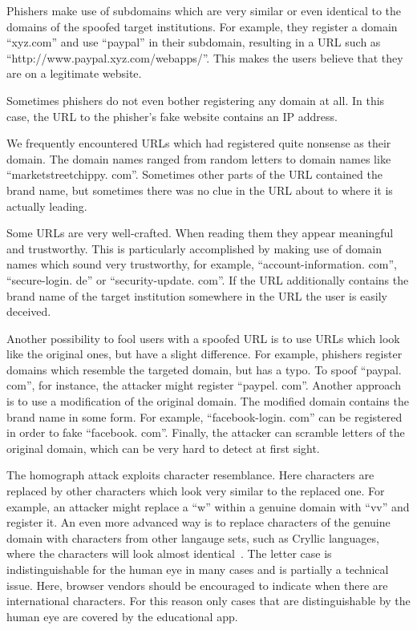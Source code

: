 \begin{description}[leftmargin=0cm]
	\item[Subdomain] Phishers make use of subdomains which are very similar or even identical to the domains of the spoofed target institutions.
 For example, they register a domain  ``xyz.com'' and use ``paypal'' in their subdomain, resulting in a URL such as ``http://www.paypal.xyz.com/webapps/''.
 This makes the users believe that they are on a legitimate website.

	\item[IP Address] Sometimes phishers do not even bother registering any domain at all.
 In this case, the URL to the phisher's fake website contains an IP address.

	\item[Nonsense Domain] We frequently encountered URLs which had registered quite nonsense as their domain.
 The domain names ranged from random letters to domain names like ``marketstreetchippy.
com''. Sometimes other parts of the URL contained the brand name, but sometimes there was no clue in the URL about to where it is actually leading.

	\item[Trustworthy, But Unrelated Domain] Some URLs are very well-crafted.
 When reading them they appear meaningful and trustworthy.
 This is particularly accomplished by making use of domain names which sound very trustworthy, for example, ``account-information.
com'', ``secure-login.
de'' or ``security-update.
com''. If the URL additionally contains the brand name of the target institution somewhere in the URL the user is easily deceived.

	\item[Similar and Deceptive Domains] Another possibility to fool users with a spoofed URL is to use URLs which look like the original ones, but have a slight difference.
 For example, phishers register domains which resemble the targeted domain, but has a typo.
 To spoof ``paypal.
com'', for instance, the attacker might register ``paypel.
com''. Another approach is to use a modification of the original domain.
 The modified domain contains the brand name in some form.
 For example, ``facebook-login.
com'' can be registered in order to fake ``facebook.
com''. Finally, the attacker can scramble letters of the original domain, which can be very hard to detect at first sight.

	\item[Homograph Attack] The homograph attack exploits character resemblance.
 Here characters are replaced by other characters which look very similar to the replaced one.
 For example, an attacker might replace a ``w'' within a genuine domain with ``vv'' and register it.
 An even more advanced way is to replace characters of the genuine domain with characters from other langauge sets, such as Cryllic languages, where the characters will look almost identical~\cite{gabrilovich2002homograph}. The letter case is indistinguishable for the human eye in many cases and is partially a technical issue.
Here, browser vendors should be encouraged to indicate when there are international characters.
 For this reason only cases that are distinguishable by the human eye are covered by the educational app.


\end{description}
